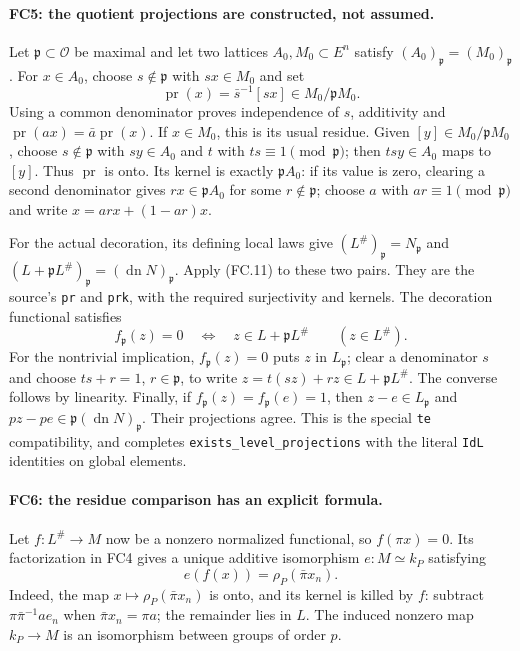 \documentclass[11pt,a4paper]{article}
\numberwithin{equation}{section}
\theoremstyle{remark}\newtheorem{remark}[theorem]{Remark}
\begin{document}
\paragraph{FC5: the quotient projections are constructed, not assumed.}
Let $\mathfrak p\subset\mathcal O$ be maximal and let two lattices
$A_0,M_0\subset E^n$ satisfy $(A_0)_{\mathfrak p}=(M_0)_{\mathfrak p}$.
For $x\in A_0$, choose $s\notin\mathfrak p$ with $sx\in M_0$ and set
\[
 \operatorname{pr}(x)=\bar s^{-1}[sx]
                 \in M_0/\mathfrak pM_0.              \tag{FC.11}
\]
Using a common denominator proves independence of $s$, additivity and
$\operatorname{pr}(ax)=\bar a\operatorname{pr}(x)$.
If $x\in M_0$, this is its usual residue. Given $[y]\in M_0/\mathfrak pM_0$,
choose $s\notin\mathfrak p$ with $sy\in A_0$ and $t$ with
$ts\equiv1\pmod{\mathfrak p}$; then $tsy\in A_0$ maps to $[y]$.
Thus $\operatorname{pr}$ is onto. Its kernel is exactly
$\mathfrak pA_0$: if its value is zero, clearing a second denominator
gives $rx\in\mathfrak pA_0$ for some $r\notin\mathfrak p$;
choose $a$ with $ar\equiv1\pmod{\mathfrak p}$ and write
$x=arx+(1-ar)x$.

For the actual decoration, its defining local laws give
$(L^\#)_{\mathfrak p}=N_{\mathfrak p}$ and
$(L+\mathfrak pL^\#)_{\mathfrak p}=(\operatorname{dn}N)_{\mathfrak p}$.
Apply (FC.11) to these two pairs. They are the source's
\texttt{pr} and \texttt{prk}, with the required surjectivity and kernels.
The decoration functional satisfies
\[
 f_{\mathfrak p}(z)=0\quad\Longleftrightarrow\quad
 z\in L+\mathfrak pL^\#\qquad(z\in L^\#).              \tag{FC.12}
\]
For the nontrivial implication, $f_{\mathfrak p}(z)=0$ puts $z$ in
$L_{\mathfrak p}$; clear a denominator $s$ and choose
$ts+r=1$, $r\in\mathfrak p$, to write
$z=t(sz)+rz\in L+\mathfrak pL^\#$. The converse follows by
linearity. Finally, if $f_{\mathfrak p}(z)=f_{\mathfrak p}(e)=1$,
then $z-e\in L_{\mathfrak p}$ and
$pz-pe\in\mathfrak p(\operatorname{dn}N)_{\mathfrak p}$.
Their projections agree. This is the special \texttt{te} compatibility,
and completes \texttt{exists\_\allowbreak level\_\allowbreak projections} with the literal
\texttt{IdL} identities on global elements.

\paragraph{FC6: the residue comparison has an explicit formula.}
Let $f:L^\#\to M$ now be a nonzero normalized functional, so
$f(\pi x)=0$. Its factorization in FC4 gives a unique additive
isomorphism $e:M\simeq k_P$ satisfying
\[
 e(f(x))=\rho_P(\bar\pi x_n).                          \tag{FC.13}
\]
Indeed, the map $x\mapsto\rho_P(\bar\pi x_n)$ is onto, and its
kernel is killed by $f$: subtract
$\pi\bar\pi^{-1}ae_n$ when $\bar\pi x_n=\pi a$; the
remainder lies in $L$. The induced nonzero map $k_P\to M$ is an
isomorphism between groups of order $p$.
\end{document}
